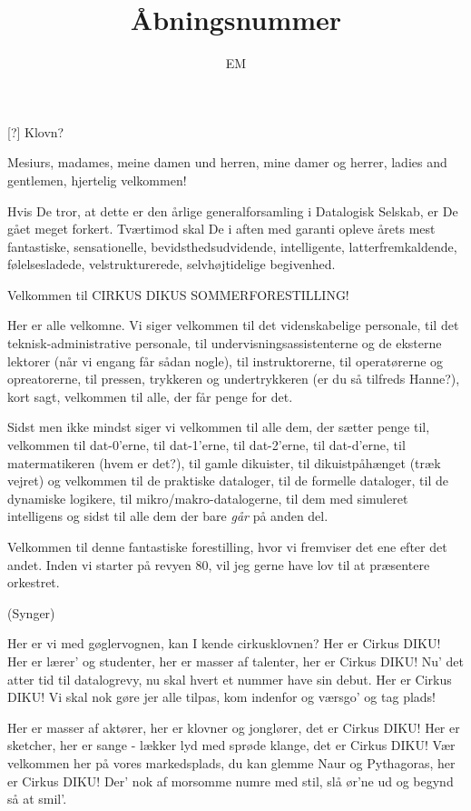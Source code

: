 \documentclass[a4paper,11pt]{article}
\title{Åbningsnummer}
\author{EM}
\begin{document}
\maketitle

\begin{roles}
[?] Klovn?
\end{roles}

\begin{sketch}


 Mesiurs, madames, meine damen und herren, mine damer og
herrer, ladies and gentlemen, hjertelig velkommen!

Hvis De tror, at dette er den årlige generalforsamling i Datalogisk
Selskab, er De gået meget forkert.  Tværtimod skal De i aften med
garanti opleve årets mest fantastiske, sensationelle,
bevidsthedsudvidende, intelligente, latterfremkaldende,
følelsesladede, velstrukturerede, selvhøjtidelige begivenhed.

Velkommen til CIRKUS DIKUS SOMMERFORESTILLING!

Her er alle velkomne.  Vi siger velkommen til det videnskabelige
personale, til det teknisk-administrative personale, til
undervisningsassistenterne og de eksterne lektorer (når vi engang får
sådan nogle), til instruktorerne, til operatørerne og opreatorerne,
til pressen, trykkeren og undertrykkeren (er du så tilfreds Hanne?),
kort sagt, velkommen til alle, der får penge for det.

Sidst men ikke mindst siger vi velkommen til alle dem, der sætter
penge til, velkommen til dat-0'erne, til dat-1'erne, til dat-2'erne,
til dat-d'erne, til matermatikeren (hvem er det?), til gamle
dikuister, til dikuistpåhænget (træk vejret) og velkommen til de
praktiske dataloger, til de formelle dataloger, til de dynamiske
logikere, til mikro/makro-datalogerne, til dem med simuleret
intelligens og sidst til alle dem der bare {\em går} på anden del.

Velkommen til denne fantastiske forestilling, hvor vi fremviser det
ene efter det andet.  Inden vi starter på revyen 80, vil jeg gerne
have lov til at præsentere orkestret.
\end{sketch}

(Synger)

\begin{song}
Her er vi med gøglervognen,
kan I kende cirkusklovnen?
Her er Cirkus DIKU!
Her er lærer' og studenter,
her er masser af talenter,
her er Cirkus DIKU!
Nu' det atter tid til datalogrevy,
nu skal hvert et nummer have sin debut.
Her er Cirkus DIKU!
Vi skal nok gøre jer alle tilpas,
kom indenfor og værsgo' og tag plads!

Her er masser af aktører,
her er klovner og jonglører,
det er Cirkus DIKU!
Her er sketcher, her er sange -
lækker lyd med sprøde klange,
det er Cirkus DIKU!
Vær velkommen her på vores markedsplads,
du kan glemme Naur og Pythagoras,
her er Cirkus DIKU!
Der' nok af morsomme numre med stil,
slå ør'ne ud og begynd så at smil'.
\end{song}
\end{document}
